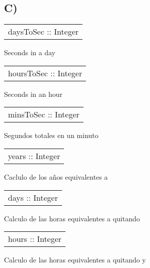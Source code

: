 \subsection{C)}
\begin{haddockdesc}
\item[\begin{tabular}{@{}l}
daysToSec :: Integer
\end{tabular}]
{\haddockbegindoc
Seconds in a day\par}
\end{haddockdesc}
\begin{haddockdesc}
\item[\begin{tabular}{@{}l}
hoursToSec :: Integer
\end{tabular}]
{\haddockbegindoc
Seconds in an hour\par}
\end{haddockdesc}
\begin{haddockdesc}
\item[\begin{tabular}{@{}l}
minsToSec :: Integer
\end{tabular}]
{\haddockbegindoc
Segundos totales en un minuto\par}
\end{haddockdesc}
\begin{haddockdesc}
\item[\begin{tabular}{@{}l}
years :: Integer
\end{tabular}]
{\haddockbegindoc
Caclulo de los años equivalentes a \par}
\end{haddockdesc}
\begin{haddockdesc}
\item[\begin{tabular}{@{}l}
days :: Integer
\end{tabular}]
{\haddockbegindoc
Calculo de las horas equivalentes a  quitando \par}
\end{haddockdesc}
\begin{haddockdesc}
\item[\begin{tabular}{@{}l}
hours :: Integer
\end{tabular}]
{\haddockbegindoc
Calculo de las horas equivalentes a  quitando  y \par}
\end{haddockdesc}
